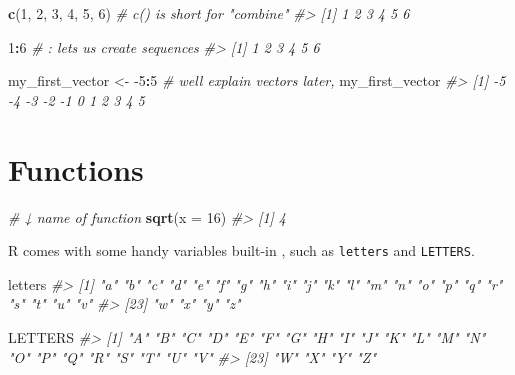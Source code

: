 \documentclass[
]{report}
\newenvironment{Shaded}{\begin{snugshade}}{\end{snugshade}}
\newcommand{\CommentTok}[1]{\textcolor[rgb]{0.56,0.35,0.01}{\textit{#1}}}
\newcommand{\DataTypeTok}[1]{\textcolor[rgb]{0.13,0.29,0.53}{#1}}
\newcommand{\DecValTok}[1]{\textcolor[rgb]{0.00,0.00,0.81}{#1}}
\newcommand{\KeywordTok}[1]{\textcolor[rgb]{0.13,0.29,0.53}{\textbf{#1}}}
\newcommand{\NormalTok}[1]{#1}
\newcommand{\OperatorTok}[1]{\textcolor[rgb]{0.81,0.36,0.00}{\textbf{#1}}}
\newcommand{\StringTok}[1]{\textcolor[rgb]{0.31,0.60,0.02}{#1}}
\begin{document}
\begin{Shaded}
\begin{Highlighting}[]
\KeywordTok{c}\NormalTok{(}\DecValTok{1}\NormalTok{, }\DecValTok{2}\NormalTok{, }\DecValTok{3}\NormalTok{, }\DecValTok{4}\NormalTok{, }\DecValTok{5}\NormalTok{, }\DecValTok{6}\NormalTok{)       }\CommentTok{\# \textasciigrave{}c()\textasciigrave{} is short for "combine"}
\CommentTok{\#\textgreater{} [1] 1 2 3 4 5 6}

\DecValTok{1}\OperatorTok{:}\DecValTok{6}                       \CommentTok{\# \textasciigrave{}:\textasciigrave{} lets us create sequences}
\CommentTok{\#\textgreater{} [1] 1 2 3 4 5 6}

\NormalTok{my\_first\_vector \textless{}{-}}\StringTok{ }\DecValTok{{-}5}\OperatorTok{:}\DecValTok{5} \CommentTok{\# we\textquotesingle{}ll explain \textasciigrave{}vector\textasciigrave{}s later,}
\NormalTok{my\_first\_vector}
\CommentTok{\#\textgreater{}  [1] {-}5 {-}4 {-}3 {-}2 {-}1  0  1  2  3  4  5}
\end{Highlighting}
\end{Shaded}

\hypertarget{functions}{%
\section{Functions}\label{functions}}

\begin{Shaded}
\begin{Highlighting}[]
\CommentTok{\# ↓️️ name of function}
\KeywordTok{sqrt}\NormalTok{(}\DataTypeTok{x =} \DecValTok{16}\NormalTok{)}
\CommentTok{\#\textgreater{} [1] 4}
\end{Highlighting}
\end{Shaded}

R comes with some handy variables built-in , such as \texttt{letters} and \texttt{LETTERS}.

\begin{Shaded}
\begin{Highlighting}[]
\NormalTok{letters}
\CommentTok{\#\textgreater{}  [1] "a" "b" "c" "d" "e" "f" "g" "h" "i" "j" "k" "l" "m" "n" "o" "p" "q" "r" "s" "t" "u" "v"}
\CommentTok{\#\textgreater{} [23] "w" "x" "y" "z"}

\NormalTok{LETTERS}
\CommentTok{\#\textgreater{}  [1] "A" "B" "C" "D" "E" "F" "G" "H" "I" "J" "K" "L" "M" "N" "O" "P" "Q" "R" "S" "T" "U" "V"}
\CommentTok{\#\textgreater{} [23] "W" "X" "Y" "Z"}
\end{Highlighting}
\end{Shaded}
\end{document}
